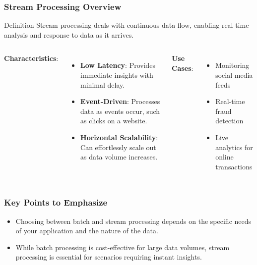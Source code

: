 \documentclass[aspectratio=169]{beamer}
\begin{document}
\begin{frame}[fragile]
    \frametitle{Stream Processing Overview}
    \begin{block}{Definition}
        Stream processing deals with continuous data flow, enabling real-time analysis and response to data as it arrives.
    \end{block}
    
    \begin{columns}
            \textbf{Characteristics}:
            \begin{itemize}
                \item \textbf{Low Latency}: Provides immediate insights with minimal delay.
                \item \textbf{Event-Driven}: Processes data as events occur, such as clicks on a website.
                \item \textbf{Horizontal Scalability}: Can effortlessly scale out as data volume increases.
            \end{itemize}
        
            \textbf{Use Cases}:
            \begin{itemize}
                \item Monitoring social media feeds
                \item Real-time fraud detection
                \item Live analytics for online transactions
            \end{itemize}
    \end{columns}
\end{frame}

\begin{frame}[fragile]
    \frametitle{Key Points to Emphasize}
    \begin{itemize}
        \item Choosing between batch and stream processing depends on the specific needs of your application and the nature of the data.
        \item While batch processing is cost-effective for large data volumes, stream processing is essential for scenarios requiring instant insights.
    \end{itemize}
\end{frame}
\end{document}
